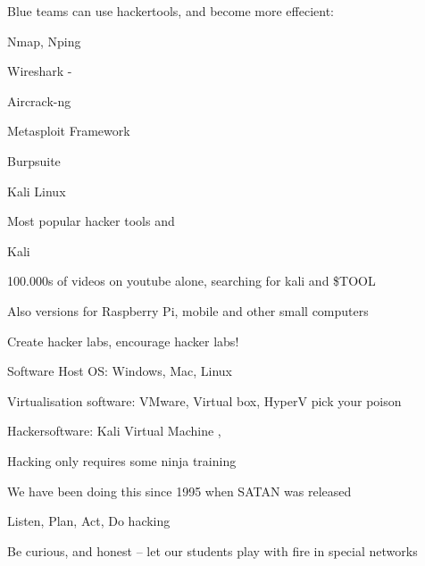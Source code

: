 \documentclass[Screen16to9,17pt]{foils}
\begin{document}
Blue teams can use hackertools, and become more effecient:
\begin{list2}
\item Nmap, Nping 
\item Wireshark - 
\item Aircrack-ng 
\item Metasploit Framework 
\item Burpsuite 
\item Kali Linux 
\end{list2}

\vskip 5mm
\centerline{Most popular hacker tools  and }




\begin{list1}
\item  Kali 
\item 100.000s of videos on youtube alone, searching for kali and \$TOOL
\item Also versions for Raspberry Pi, mobile and other small computers
\end{list1}




\begin{list2}
\item Create hacker labs, encourage hacker labs!
\item Software Host OS: Windows, Mac, Linux
\item Virtualisation software: VMware, Virtual box, HyperV pick your poison
\item Hackersoftware: Kali Virtual Machine  ,
\end{list2}



\begin{list2}
\item Hacking only requires some ninja training
\item We have been doing this since 1995 when SATAN was released
\item Listen, Plan, Act, Do hacking
\item Be curious, and honest -- let our students play with fire in special networks
\end{list2}
\end{document}
